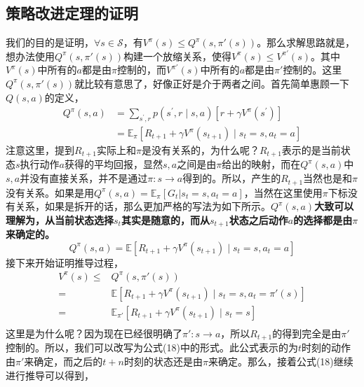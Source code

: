 \documentclass[a4paper]{article}
\begin{document}
\subsection{策略改进定理的证明}
我们的目的是证明，$\forall s \in \mathcal{S}$，有$V^\pi(s) \leq Q^\pi(s,\pi'(s))$。那么求解思路就是，想办法使用$Q^\pi(s,\pi'(s))$构建一个放缩关系，使得$V^\pi(s) \leq V^{\pi'}(s)$。其中$V^\pi(s)$中所有的$a$都是由$\pi$控制的，而$V^{\pi'}(s)$中所有的$a$都是由$\pi'$控制的。这里$Q^\pi(s,\pi'(s))$就比较有意思了，好像正好是介于两者之间。首先简单惠顾一下$Q(s,a)$的定义，
\begin{equation}\begin{aligned}
Q^{\pi}(s, a) &=\sum_{s^{\prime}, r} p\left(s^{\prime}, r \mid s, a\right)\left[r+\gamma V^{\pi}\left(s^{\prime}\right)\right] \\
&=\mathbb{E}_{\pi}\left[R_{t+1}+\gamma V^{
\pi}\left(s_{t+1}\right) \mid s_{t}=s,a_t =a\right]
\end{aligned}\end{equation}
注意这里，提到$R_{t+1}$实际上和$\pi$是没有关系的，为什么呢？$R_{t+1}$表示的是当前状态$s$执行动作$a$获得的平均回报，显然$s,a$之间是由$\pi$给出的映射，而在$Q^\pi(s,a)$中$s,a$并没有直接关系，并不是通过$\pi:s\to a$得到的。所以，产生的$R_{t+1}$当然也是和$\pi$没有关系。如果是用$Q^\pi(s,a) = \mathbb{E}_\pi[G_t|s_t=s,a_t=a]$，当然在这里使用$\pi$下标没有关系，如果是拆开的话，那么更加严格的写法为如下所示。\textbf{$Q^\pi(s,a)$大致可以理解为，从当前状态选择$s_t$其实是随意的，而从$s_{t+1}$状态之后动作$a$的选择都是由$\pi$来确定的。}
\begin{equation}
    Q^\pi(s,a) = \mathbb{E}\left[R_{t+1}+\gamma V^{
\pi}\left(s_{t+1}\right) \mid s_{t}=s,a_t =a\right]
\end{equation}
接下来开始证明推导过程，
\begin{equation}
    \begin{aligned}
        V^\pi(s) \leq & Q^\pi(s,\pi'(s)) \\
        = & \mathbb{E}\left[R_{t+1}+\gamma V^{
        \pi}\left(s_{t+1}\right) \mid s_{t}=s,a_t =\pi'(s)\right] \\
        = & \mathbb{E}_{\pi'}\left[R_{t+1}+\gamma V^{
        \pi}\left(s_{t+1}\right) \mid s_{t}=s\right] \\
    \end{aligned}
\end{equation}
这里是为什么呢？因为现在已经很明确了$\pi':s\to a$，所以$R_{t+1}$的得到完全是由$\pi'$控制的。所以，我们可以改写为公式(18)中的形式。此公式表示的为$t$时刻的动作由$\pi'$来确定，而之后的$t+n$时刻的状态还是由$\pi$来确定。那么，接着公式(18)继续进行推导可以得到，
\end{document}
